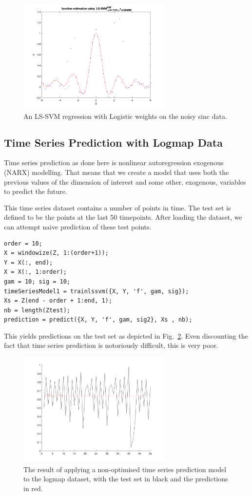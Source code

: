 \documentclass[10pt,a4paper]{article}
\begin{document}
\begin{figure}[h!]
\centering
  \includegraphics[width=3in]{robustLogistic.png}
  \caption{An LS-SVM regression with Logistic weights on the noisy sinc data.}
  \label{fig:logisticRobust}
\end{figure}



\subsection{Time Series Prediction with Logmap Data}
Time series prediction as done here is nonlinear autoregression exogenous (NARX) modelling. That means that we create a model that uses both the previous values of the dimension of interest and some other, exogenous, variables to predict the future.

This time series dataset contains a number of points in time. The test set is defined to be the points at the last 50 timepoints. After loading the dataset, we can attempt naive prediction of these test points.

\begin{lstlisting}[style=Matlab-editor, frame=single]
order = 10;
X = windowize(Z, 1:(order+1));
Y = X(:, end);
X = X(:, 1:order);
gam = 10; sig = 10;
timeSeriesModel1 = trainlssvm({X, Y, 'f', gam, sig});
Xs = Z(end - order + 1:end, 1);
nb = length(Ztest);
prediction = predict({X, Y, 'f', gam, sig2}, Xs , nb);
\end{lstlisting}

This yields predictions on the test set as depicted in Fig.~\ref{fig:logmapNaive}. Even discounting the fact that time series prediction is notoriously difficult, this is very poor.

\begin{figure}[h!]
\centering
  \includegraphics[width=3in]{logmapNaive.png}
  \caption{The result of applying a non-optimised time series prediction model to the logmap dataset, with the test set in black and the predictions in red.}
  \label{fig:logmapNaive}
\end{figure}
 
\end{document}
